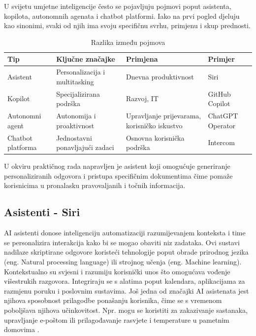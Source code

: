 \documentclass[]{foi}
\renewcommand{\arraystretch}{1.3}
\begin{document}
U svijetu umjetne inteligencije često se pojavljuju pojmovi poput asistenta, kopilota, autonomnih agenata i chatbot platformi. Iako na prvi pogled djeluju kao sinonimi, svaki od njih ima svoju 
specifičnu svrhu, primjenu i skup prednosti.

\begin{table}[ht!]
\centering
\renewcommand{\arraystretch}{1.3}
\begin{tabularx}{\textwidth}{|l|X|X|X|}
\hline
\textbf{Tip} & \textbf{Ključne značajke} & \textbf{Primjena} & \textbf{Primjer} \\
\hline
Asistent & Personalizacija i multitasking & Dnevna produktivnost & Siri \\
\hline
Kopilot & Specijalizirana podrška & Razvoj, IT & GitHub Copilot \\
\hline
Autonomni agent & Autonomija i proaktivnost & Upravljanje prijevarama, korisničko iskustvo & ChatGPT Operator \\
\hline
Chatbot platforma & Jednostavni ponavljajući zadaci & Osnovna korisnička podrška & Intercom \\
\hline
\end{tabularx}
\caption{Razlika između pojmova \cite{exomindset2025difference}}
\label{tab:chatbot_usporedba}
\end{table}

U okviru praktičnog rada napravljen je asistent koji omogućuje generiranje personaliziranih odgovora i pristupa specifičnim dokumentima čime
pomaže korisnicima u pronalasku pravovaljanih i točnih informacija. 

\subsection{Asistenti - Siri}
AI asistenti donose inteligenciju automatizaciji razumijevanjem konteksta i time se personalizira interakcija kako bi se mogao obaviti niz zadataka. Ovi sustavi nadilaze skriptirane odgovore
koristeći tehnologije poput obrade prirodnog jezika (eng. Natural processing language) ili strojnog učenja (eng. Machine learning). Kontekstualno su svjesni i razumiju korisnički unos što omogućava
vođenje višestrukih razgovora. Integriraju se s alatima poput kalendara, aplikacijama za razmjenu poruku i poslovnim sustavima. Još jedna od značajki AI asistenata jest njihova sposobnost prilagodbe ponašanju korisnika, čime se s vremenom poboljšava njihova učinkovitost.
Npr. mogu se koristiti za zakazivanje sastanaka, upravljanje e-poštom ili prilagođavanje rasvjete i temperature u pametnim domovima \cite{exomindset2025difference}.
\end{document}
